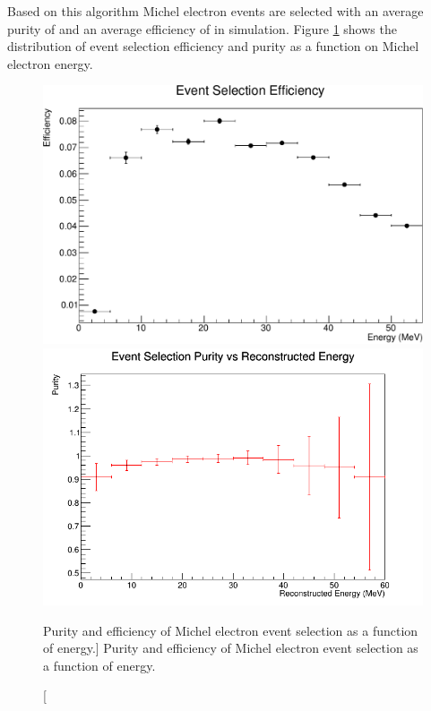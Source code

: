 Based on this algorithm Michel electron events are selected with an average
purity of  and an average efficiency of  
in \protodune{} simulation. Figure \ref{fig:efficiency_v_energy} shows the
distribution of event selection efficiency and purity as a function on Michel
electron energy. 
\begin{figure}
	\centering
	\includegraphics[width=\textwidth, height=0.68\textwidth]{figures/eff_v_energy.pdf}
	\includegraphics[width=\textwidth]{figures/MC_purity_v_energy.png}
	\caption
	[Purity and efficiency of Michel electron event selection as a function of
	energy.]
	{Purity and efficiency of Michel electron event selection as a function of
	energy.}
	\label{fig:efficiency_v_energy}
\end{figure}

